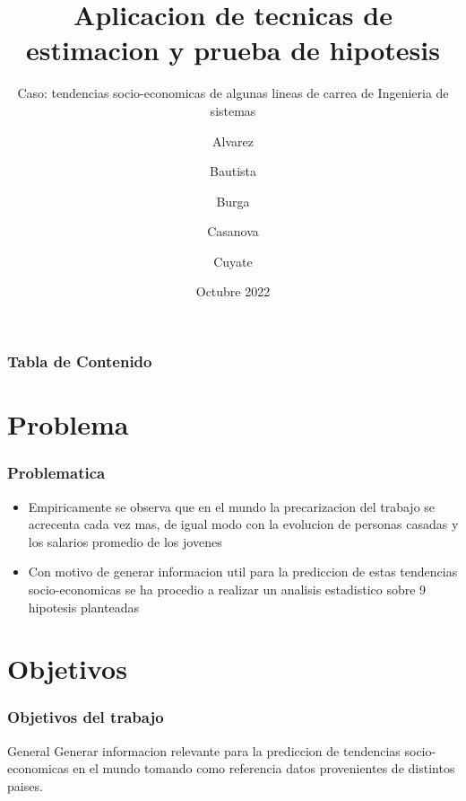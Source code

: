 \documentclass{beamer}
\title[PC1 Estadistica Aplicada] %
{Aplicacion de tecnicas de estimacion y prueba de hipotesis}
\subtitle{
  Caso: tendencias socio-economicas de algunas
  lineas de carrea de Ingenieria de sistemas
}
\author %
{
  Alvarez \and Bautista \and Burga \and
  Casanova \and  Cuyate
}
\institute
{
  Facultad de Ingenieria Industrial y de Sistemas\\
  \textbf{Universidad Nacional de Ingenieria}
}
\date
{Octubre 2022}
\begin{document}
\frame{\titlepage}


\begin{frame}
\frametitle{Tabla de Contenido}
\tableofcontents
\end{frame}

\section{Problema}

\begin{frame}
\frametitle{Problematica}

\begin{itemize}
    \item Empiricamente se observa que en el mundo la precarizacion del trabajo
se acrecenta cada vez mas, de igual modo con la evolucion
    de personas casadas y los salarios promedio de los jovenes
    \item Con motivo de generar informacion util para la prediccion de estas tendencias
socio-economicas se ha procedio a realizar un analisis estadistico sobre
9 hipotesis planteadas

\end{itemize}
\end{frame}



\section{Objetivos}

\begin{frame}

\frametitle{Objetivos del trabajo}

\begin{alertblock}{General}
  Generar informacion relevante para la prediccion de tendencias
  socio-economicas en el mundo tomando como referencia datos
  provenientes de distintos paises.
\end{alertblock}
\end{frame}
\end{document}
